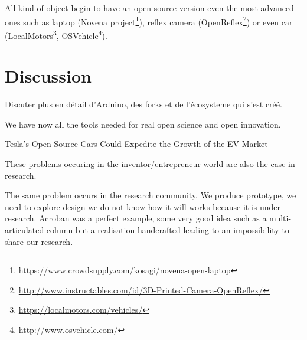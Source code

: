 All kind of object begin to have an open source version even the most advanced ones such as laptop (Novena project\footnote{\url{https://www.crowdsupply.com/kosagi/novena-open-laptop}}), reflex camera (OpenReflex\footnote{\url{http://www.instructables.com/id/3D-Printed-Camera-OpenReflex/}}) or even car (LocalMotors\footnote{\url{https://localmotors.com/vehicles/}}, OSVehicle\footnote{\url{http://www.osvehicle.com/}}).






\section{Discussion} %

Discuter plus en détail d'Arduino, des forks et de l'écosysteme qui s'est créé.

We have now all the tools needed for real open science and open innovation.

Tesla's Open Source Cars Could Expedite the Growth of the EV Market

These problems occuring in the inventor/entrepreneur world are also the case in research.

The same problem occurs in the research community.
We produce prototype, we need to explore design we do not know how it will works because it is under research.
Acroban was a perfect example, some very good idea such as a multi-articulated column but a realisation handcrafted leading to an impossibility to share our research.
